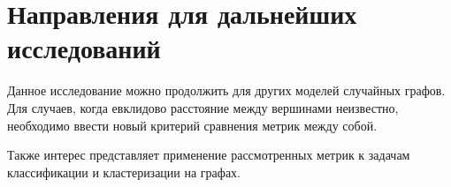 \section*{Направления для дальнейших исследований}

Данное исследование можно продолжить для других моделей случайных графов. Для случаев, когда евклидово расстояние между вершинами неизвестно, необходимо ввести новый критерий сравнения метрик между собой.

Также интерес представляет применение рассмотренных метрик к задачам классификации и кластеризации на графах.